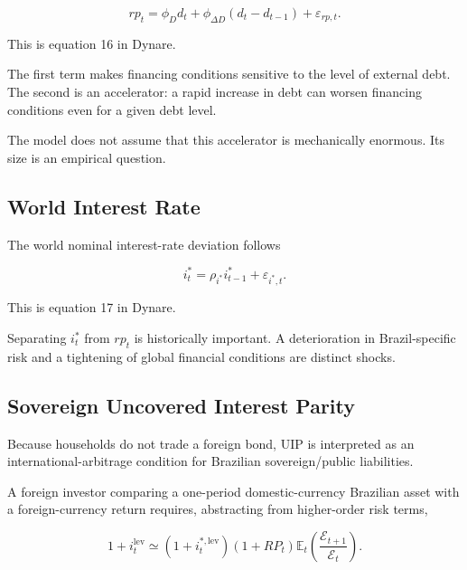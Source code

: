 \begin{equation}
\boxed{
rp_t
=
\phi_Dd_t
+
\phi_{\Delta D}(d_t-d_{t-1})
+
\varepsilon_{rp,t}.
}
\label{eq:rp_final}
\end{equation}

This is equation 16 in Dynare.

The first term makes financing conditions sensitive to the level of external
debt. The second is an accelerator: a rapid increase in debt can worsen
financing conditions even for a given debt level.

The model does not assume that this accelerator is mechanically enormous. Its
size is an empirical question.

\subsection{World Interest Rate}
\label{app:worldrate}

The world nominal interest-rate deviation follows

\begin{equation}
\boxed{
i_t^{*}
=
\rho_{i^{*}}i_{t-1}^{*}
+
\varepsilon_{i^{*},t}.
}
\label{eq:istar_final}
\end{equation}

This is equation 17 in Dynare.

Separating \(i_t^{*}\) from \(rp_t\) is historically important. A deterioration
in Brazil-specific risk and a tightening of global financial conditions are
distinct shocks.

\subsection{Sovereign Uncovered Interest Parity}
\label{app:uip}

Because households do not trade a foreign bond, UIP is interpreted as an
international-arbitrage condition for Brazilian sovereign/public liabilities.

A foreign investor comparing a one-period domestic-currency Brazilian asset
with a foreign-currency return requires, abstracting from higher-order risk
terms,

\begin{equation}
1+i_t^{\mathrm{lev}}
\simeq
(1+i_t^{*,\mathrm{lev}})
(1+RP_t)
\mathbb E_t
\left(
\frac{\mathcal E_{t+1}}{\mathcal E_t}
\right).
\label{eq:uip_gross}
\end{equation}


